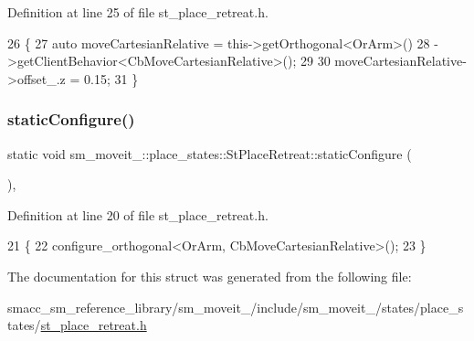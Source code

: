 Definition at line 25 of file st\+\_\+place\+\_\+retreat.\+h.


\begin{DoxyCode}
26     \{
27         \textcolor{keyword}{auto} moveCartesianRelative = this->getOrthogonal<OrArm>()
28                                          ->getClientBehavior<CbMoveCartesianRelative>();
29 
30         moveCartesianRelative->offset\_.z = 0.15;
31     \}
\end{DoxyCode}
\mbox{\label{structsm__moveit__4_1_1place__states_1_1StPlaceRetreat_aa3f44a56c5471fb113afb7b3cfd7d44e}} 
\subsubsection{\texorpdfstring{static\+Configure()}{staticConfigure()}}
{\footnotesize\ttfamily static void sm\+\_\+moveit\+\_\+::place\+\_\+states\+::\+St\+Place\+Retreat\+::static\+Configure (\begin{DoxyParamCaption}{ }\end{DoxyParamCaption})\hspace{0.3cm}{\ttfamily [inline]}, {\ttfamily [static]}}



Definition at line 20 of file st\+\_\+place\+\_\+retreat.\+h.


\begin{DoxyCode}
21     \{
22         configure\_orthogonal<OrArm, CbMoveCartesianRelative>();
23     \}
\end{DoxyCode}


The documentation for this struct was generated from the following file\+:\begin{DoxyCompactItemize}
\item 
smacc\+\_\+sm\+\_\+reference\+\_\+library/sm\+\_\+moveit\+\_/include/sm\+\_\+moveit\+\_/states/place\+\_\+states/\hyperlink{4_2include_2sm__moveit__4_2states_2place__states_2st__place__retreat_8h}{st\+\_\+place\+\_\+retreat.\+h}\end{DoxyCompactItemize}
